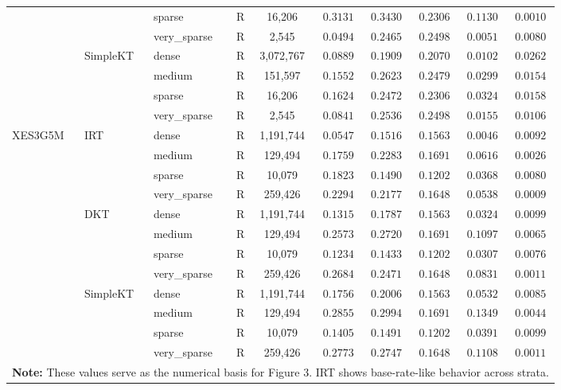 \begin{table}[H]
{\begin{tabular}{lllrcccccc}
 &  & sparse & R & 16,206 & $0.3131$ & $0.3430$ & $0.2306$ & $0.1130$ & $0.0010$ \\
 &  & very\_sparse & R & 2,545 & $0.0494$ & $0.2465$ & $0.2498$ & $0.0051$ & $0.0080$ \\
 & SimpleKT & dense & R & 3,072,767 & $0.0889$ & $0.1909$ & $0.2070$ & $0.0102$ & $0.0262$ \\
 &  & medium & R & 151,597 & $0.1552$ & $0.2623$ & $0.2479$ & $0.0299$ & $0.0154$ \\
 &  & sparse & R & 16,206 & $0.1624$ & $0.2472$ & $0.2306$ & $0.0324$ & $0.0158$ \\
 &  & very\_sparse & R & 2,545 & $0.0841$ & $0.2536$ & $0.2498$ & $0.0155$ & $0.0106$ \\
\midrule
XES3G5M & IRT & dense & R & 1,191,744 & $0.0547$ & $0.1516$ & $0.1563$ & $0.0046$ & $0.0092$ \\
 &  & medium & R & 129,494 & $0.1759$ & $0.2283$ & $0.1691$ & $0.0616$ & $0.0026$ \\
 &  & sparse & R & 10,079 & $0.1823$ & $0.1490$ & $0.1202$ & $0.0368$ & $0.0080$ \\
 &  & very\_sparse & R & 259,426 & $0.2294$ & $0.2177$ & $0.1648$ & $0.0538$ & $0.0009$ \\
 & DKT & dense & R & 1,191,744 & $0.1315$ & $0.1787$ & $0.1563$ & $0.0324$ & $0.0099$ \\
 &  & medium & R & 129,494 & $0.2573$ & $0.2720$ & $0.1691$ & $0.1097$ & $0.0065$ \\
 &  & sparse & R & 10,079 & $0.1234$ & $0.1433$ & $0.1202$ & $0.0307$ & $0.0076$ \\
 &  & very\_sparse & R & 259,426 & $0.2684$ & $0.2471$ & $0.1648$ & $0.0831$ & $0.0011$ \\
 & SimpleKT & dense & R & 1,191,744 & $0.1756$ & $0.2006$ & $0.1563$ & $0.0532$ & $0.0085$ \\
 &  & medium & R & 129,494 & $0.2855$ & $0.2994$ & $0.1691$ & $0.1349$ & $0.0044$ \\
 &  & sparse & R & 10,079 & $0.1405$ & $0.1491$ & $0.1202$ & $0.0391$ & $0.0099$ \\
 &  & very\_sparse & R & 259,426 & $0.2773$ & $0.2747$ & $0.1648$ & $0.1108$ & $0.0011$ \\
\bottomrule
\multicolumn{10}{p{17.5cm}}{\scriptsize \textbf{Note:} These values serve as the numerical basis for Figure 3. IRT shows base-rate-like behavior across strata.} \\
\end{tabular}%
}
\end{table}
